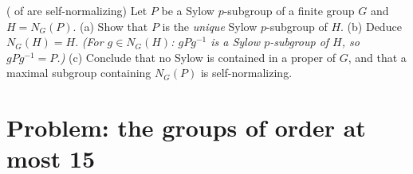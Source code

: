 \begin{exercise}[$\star\star$]\label{exo:b3:groups:12}
( of  are self-normalizing) Let $P$
be a Sylow $p$-subgroup of a finite group $G$ and $H =
N_G(P)$.
(a) Show that $P$ is the \emph{unique} Sylow $p$-subgroup of
$H$.
(b) Deduce $N_G(H) = H$. \emph{(For $g \in N_G(H)$: $gPg^{-1}$
is a Sylow $p$-subgroup of $H$, so $gPg^{-1} = P$.)}
(c) Conclude that no Sylow  is contained in a proper
 of $G$, and that a maximal subgroup containing
$N_G(P)$ is self-normalizing.
\end{exercise}

\section{Problem: the groups of order at most 15}

